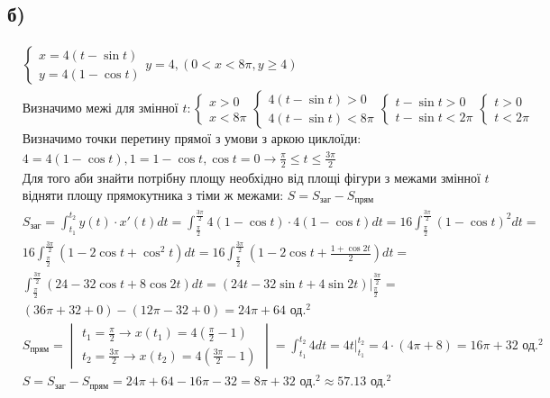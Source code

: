 \documentclass{report}
\begin{document}
\subsection{б)}
\begin{equation}\label{eq1_b}\begin{split}
	& \begin{cases}x = 4(t - \sin t)\\y = 4(1 - \cos t)\end{cases} y = 4, (0 < x < 8\pi, y \geq 4)\\
	& \text{Визначимо межі для змінної } t: \begin{cases}x > 0\\x < 8\pi\end{cases} \begin{cases}4(t - \sin t) > 0\\4(t - \sin t) < 8\pi\end{cases} \begin{cases}t - \sin t > 0\\t - \sin t < 2\pi\end{cases} \begin{cases}t > 0\\t < 2\pi\end{cases}\\
	& \text{Визначимо точки перетину прямої з умови з аркою циклоїди: }\\
	& 4 = 4(1 - \cos t), 1 = 1 - \cos t, \cos t = 0 \to \frac{\pi}{2} \leq t \leq \frac{3\pi}{2}\\
	& \text{Для того аби знайти потрібну площу необхідно від площі фігури з межами змінної } t\\
	& \text{відняти площу прямокутника з тіми ж межами: } S = S_{\text{заг}} - S_{\text{прям}}\\
	& S_{\text{заг}} = \int_{t_1}^{t_2}y(t)\cdot x'(t)dt = \int_{\frac{\pi}{2}}^{\frac{3\pi}{2}}4(1 - \cos t) \cdot 4(1 - \cos t) dt =  16\int_{\frac{\pi}{2}}^{\frac{3\pi}{2}}(1 - \cos t)^2 dt =\\
	& 16\int_{\frac{\pi}{2}}^{\frac{3\pi}{2}} (1 - 2\cos t + \cos^2 t) dt = 16\int_{\frac{\pi}{2}}^{\frac{3\pi}{2}}\left(1 - 2\cos t + \frac{1 + \cos 2t}{2}\right) dt =\\
	& \int_{\frac{\pi}{2}}^{\frac{3\pi}{2}} (24 - 32\cos t + 8\cos2t)dt = (24t - 32\sin t + 4\sin2t)\bigg|_{\frac{\pi}{2}}^{\frac{3\pi}{2}} =\\
	& (36\pi + 32 + 0) - (12\pi - 32 + 0) = 24\pi + 64 \text{ од.}^2\\
	& S_{\text{прям}} = \begin{vmatrix}t_1 = \frac{\pi}{2}\to x(t_1) = 4(\frac{\pi}{2} - 1)\\
t_2 = \frac{3\pi}{2} \to x(t_2) = 4(\frac{3\pi}{2} - 1)\end{vmatrix} = \int_{t_1}^{t_2} 4dt = 4t|_{t_1}^{t_2} = 4 \cdot (4\pi + 8) = 16\pi + 32 \text{ од.}^2\\
	& S =  S_{\text{заг}} - S_{\text{прям}} = 24\pi + 64 - 16\pi - 32 = 8\pi + 32 \text{ од.}^2 \approx 57.13 \text{ од.}^2
\end{split}\end{equation}
\end{document}
